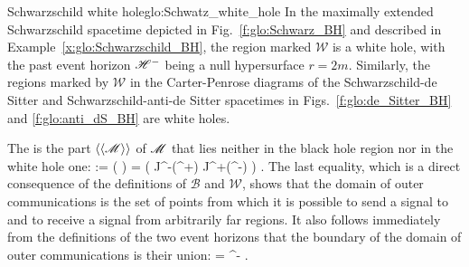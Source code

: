 \begin{texample}{Schwarzschild white hole}{glo:Schwatz_white_hole}
In the maximally extended Schwarzschild spacetime depicted in Fig.~\ref{f:glo:Schwarz_BH}
and described in Example~\ref{x:glo:Schwarzschild_BH}, the region marked $\mathscr{W}$ is
a white hole, with the past event horizon $\mathscr{H}^-$ being a null hypersurface $r=2m$. Similarly, the regions marked by $\mathscr{W}$ in the
Carter-Penrose diagrams of the Schwarzschild-de Sitter and Schwarzschild-anti-de Sitter
spacetimes in Figs.~\ref{f:glo:de_Sitter_BH} and \ref{f:glo:anti_dS_BH}
are white holes.
\end{texample}

The 
is the part $\langle\langle \mathscr{M}\rangle\rangle$ of $\mathscr{M}$ that lies neither
in the black hole region nor in the white hole one:
\be \label{e:glo:def_doc}
    \langle\langle \M\rangle\rangle := \M\setminus (\cup {} )
            = \left( J^-(\scri^+) \cap J^+(\scri^-) \right) \cap \M .
\ee
The last equality, which is a direct consequence of the definitions of
$\mathscr{B}$ and $\mathscr{W}$, shows that the domain of outer communications
is the set of points from which it is possible to send a signal to and to
receive a signal from arbitrarily far regions.
It also follows immediately from the definitions of the two event horizons
that the boundary of the domain of outer communications is their union:
\be
    \partial \langle\langle \M\rangle\rangle  = \Hor \cup \Hor^- .
\ee

